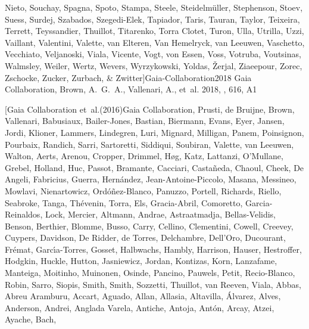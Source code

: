 \documentclass[onecolumn]{aa}
\begin{document}
\begin{thebibliography}{149}
{{			Nieto}, {Souchay}, {Spagna}, {Spoto}, {Stampa}, {Steele},
		{Steidelm{\"u}ller}, {Stephenson}, {Stoev}, {Suess}, {Surdej}, {Szabados},
		{Szegedi-Elek}, {Tapiador}, {Taris}, {Tauran}, {Taylor}, {Teixeira},
		{Terrett}, {Teyssandier}, {Thuillot}, {Titarenko}, {Torra Clotet}, {Turon},
		{Ulla}, {Utrilla}, {Uzzi}, {Vaillant}, {Valentini}, {Valette}, {van Elteren},
		{Van Hemelryck}, {van Leeuwen}, {Vaschetto}, {Vecchiato}, {Veljanoski},
		{Viala}, {Vicente}, {Vogt}, {von Essen}, {Voss}, {Votruba}, {Voutsinas},
		{Walmsley}, {Weiler}, {Wertz}, {Wevers}, {Wyrzykowski}, {Yoldas},
		{{\v{Z}}erjal}, {Ziaeepour}, {Zorec}, {Zschocke}, {Zucker}, {Zurbach}, \&
		{Zwitter}}]{Gaia-Collaboration2018}
	{Gaia Collaboration}, {Brown}, A.~G.~A., {Vallenari}, A., {et~al.} 2018, \aap,
	616, A1
	
	\bibitem[{{Gaia Collaboration} {et~al.}(2016){Gaia Collaboration}, {Prusti},
		{de Bruijne}, {Brown}, {Vallenari}, {Babusiaux}, {Bailer-Jones}, {Bastian},
		{Biermann}, {Evans}, {Eyer}, {Jansen}, {Jordi}, {Klioner}, {Lammers},
		{Lindegren}, {Luri}, {Mignard}, {Milligan}, {Panem}, {Poinsignon},
		{Pourbaix}, {Randich}, {Sarri}, {Sartoretti}, {Siddiqui}, {Soubiran},
		{Valette}, {van Leeuwen}, {Walton}, {Aerts}, {Arenou}, {Cropper}, {Drimmel},
		{H{\o}g}, {Katz}, {Lattanzi}, {O'Mullane}, {Grebel}, {Holland}, {Huc},
		{Passot}, {Bramante}, {Cacciari}, {Casta{\~n}eda}, {Chaoul}, {Cheek}, {De
			Angeli}, {Fabricius}, {Guerra}, {Hern{\'a}ndez}, {Jean-Antoine-Piccolo},
		{Masana}, {Messineo}, {Mowlavi}, {Nienartowicz}, {Ord{\'o}{\~n}ez-Blanco},
		{Panuzzo}, {Portell}, {Richards}, {Riello}, {Seabroke}, {Tanga},
		{Th{\'e}venin}, {Torra}, {Els}, {Gracia-Abril}, {Comoretto},
		{Garcia-Reinaldos}, {Lock}, {Mercier}, {Altmann}, {Andrae}, {Astraatmadja},
		{Bellas-Velidis}, {Benson}, {Berthier}, {Blomme}, {Busso}, {Carry},
		{Cellino}, {Clementini}, {Cowell}, {Creevey}, {Cuypers}, {Davidson}, {De
			Ridder}, {de Torres}, {Delchambre}, {Dell'Oro}, {Ducourant}, {Fr{\'e}mat},
		{Garc{\'\i}a-Torres}, {Gosset}, {Halbwachs}, {Hambly}, {Harrison}, {Hauser},
		{Hestroffer}, {Hodgkin}, {Huckle}, {Hutton}, {Jasniewicz}, {Jordan},
		{Kontizas}, {Korn}, {Lanzafame}, {Manteiga}, {Moitinho}, {Muinonen},
		{Osinde}, {Pancino}, {Pauwels}, {Petit}, {Recio-Blanco}, {Robin}, {Sarro},
		{Siopis}, {Smith}, {Smith}, {Sozzetti}, {Thuillot}, {van Reeven}, {Viala},
		{Abbas}, {Abreu Aramburu}, {Accart}, {Aguado}, {Allan}, {Allasia},
		{Altavilla}, {{\'A}lvarez}, {Alves}, {Anderson}, {Andrei}, {Anglada Varela},
		{Antiche}, {Antoja}, {Ant{\'o}n}, {Arcay}, {Atzei}, {Ayache}, {Bach},
}
\end{thebibliography}
\end{document}
